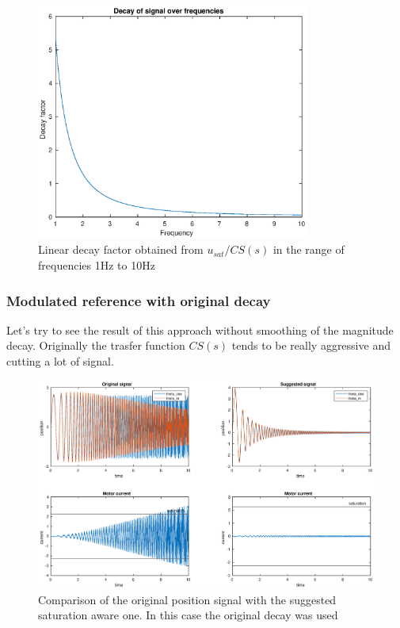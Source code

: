 \documentclass[a4paper,11pt]{article}
\begin{document}
\begin{figure}[H]
\begin{center}
\includegraphics[width=0.8\textwidth]{images/decay.eps}
\end{center}
\caption{Linear decay factor obtained from $u_{sat}/CS(s)$ in the range of frequencies 1Hz to 10Hz}
\label{fig:position_ref}
\end{figure}

\newpage

\subsubsection{Modulated reference with original decay}
\noindent Let's try to see the result of this approach without smoothing of the magnitude decay. Originally the trasfer function $CS(s)$ tends to be really aggressive and cutting a lot of signal.

\begin{figure}[H]
\begin{center}
\hspace*{-5cm}
\includegraphics[width=1.6\textwidth]{images/position_tau2.eps}
\end{center}
\caption{Comparison of the original position signal with the suggested saturation aware one. In this case the original decay was used}
\label{fig:position_tau}
\end{figure}
\end{document}
